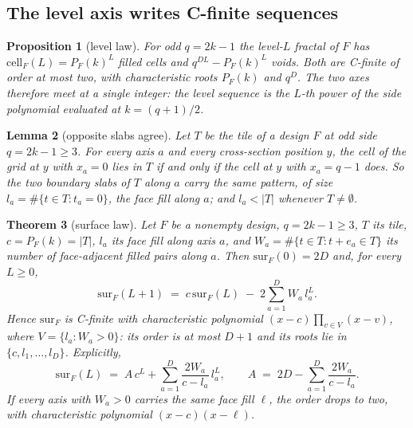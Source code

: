 \documentclass[11pt]{amsart}
\newtheorem{theorem}{Theorem}[section]
\newtheorem{proposition}[theorem]{Proposition}
\newtheorem{lemma}[theorem]{Lemma}
\theoremstyle{definition}
\theoremstyle{remark}
\begin{document}
\subsection*{The level axis writes C-finite sequences}

\begin{proposition}[level law]
\label{prop:level}
For odd $q = 2k-1$ the level-$L$ fractal of $F$ has $\mathrm{cell}_{F}(L) = P_{F}(k)^{L}$ filled cells and $q^{DL}-P_{F}(k)^{L}$ voids. Both are C-finite of order at most two, with characteristic roots $P_{F}(k)$ and $q^{D}$. The two axes therefore meet at a single integer: the level sequence is the $L$-th power of the side polynomial evaluated at $k = (q+1)/2$.
\end{proposition}

\begin{lemma}[opposite slabs agree]
\label{lem:slab}
Let $T$ be the tile of a design $F$ at odd side $q = 2k-1 \ge 3$. For every axis $a$ and every cross-section position $y$, the cell of the grid at $y$ with $x_{a}=0$ lies in $T$ if and only if the cell at $y$ with $x_{a}=q-1$ does. So the two boundary slabs of $T$ along $a$ carry the same pattern, of size $l_{a} = \#\{t \in T : t_{a} = 0\}$, the \emph{face fill} along $a$; and $l_{a} < |T|$ whenever $T \neq \emptyset$.
\end{lemma}

\begin{theorem}[surface law]
\label{thm:surface}
Let $F$ be a nonempty design, $q = 2k-1 \ge 3$, $T$ its tile, $c = P_{F}(k) = |T|$, $l_{a}$ its face fill along axis $a$, and $W_{a} = \#\{t \in T : t + e_{a} \in T\}$ its number of face-adjacent filled pairs along $a$. Then $\mathrm{sur}_{F}(0) = 2D$ and, for every $L \ge 0$,
\[
  \mathrm{sur}_{F}(L+1) \;=\; c\,\mathrm{sur}_{F}(L) \;-\; 2\sum_{a=1}^{D} W_{a}\,l_{a}^{L}.
\]
Hence $\mathrm{sur}_{F}$ is C-finite with characteristic polynomial $(x-c)\prod_{v \in V}(x-v)$, where $V = \{l_{a} : W_{a} > 0\}$: its order is at most $D+1$ and its roots lie in $\{c, l_{1},\dots,l_{D}\}$. Explicitly,
\[
  \mathrm{sur}_{F}(L) \;=\; A\,c^{L} + \sum_{a=1}^{D}\frac{2W_{a}}{c-l_{a}}\,l_{a}^{L},
  \qquad
  A \;=\; 2D - \sum_{a=1}^{D}\frac{2W_{a}}{c-l_{a}} .
\]
If every axis with $W_{a} > 0$ carries the same face fill $\ell$, the order drops to two, with characteristic polynomial $(x-c)(x-\ell)$.
\end{theorem}
\end{document}

